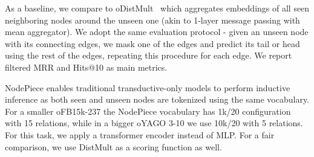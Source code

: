 \documentclass{article} \usepackage{iclr2022_conference,times}
\begin{document}
As a baseline, we compare to oDistMult~\citep{albooyeh-etal-2020-sample} which aggregates embeddings of all seen neighboring nodes around the unseen one (akin to 1-layer message passing with mean aggregator).
We adopt the same evaluation protocol - given an unseen node with its connecting edges, we mask one of the edges and predict its tail or head using the rest of the edges, repeating this procedure for each edge. 
We report filtered MRR and Hits@10 as main metrics.

NodePiece enables traditional transductive-only models to perform inductive inference as both seen and unseen nodes are tokenized using the same vocabulary. 
For a smaller oFB15k-237 the NodePiece vocabulary has 1k/20 configuration with 15 relations, while in a bigger oYAGO 3-10 we use 10k/20 with 5 relations. 
For this task, we apply a transformer encoder instead of MLP. 
For a fair comparison, we use DistMult as a scoring function as well.

\begin{table}[t]
\centering
\caption{Out-of-sample link prediction.  results are taken from ~\citep{albooyeh-etal-2020-sample}.  denotes vocabulary size (anchors + relations), \#P is a total parameter count (millions).}
\label{tab:ooslp}
\end{table}
\end{document}
